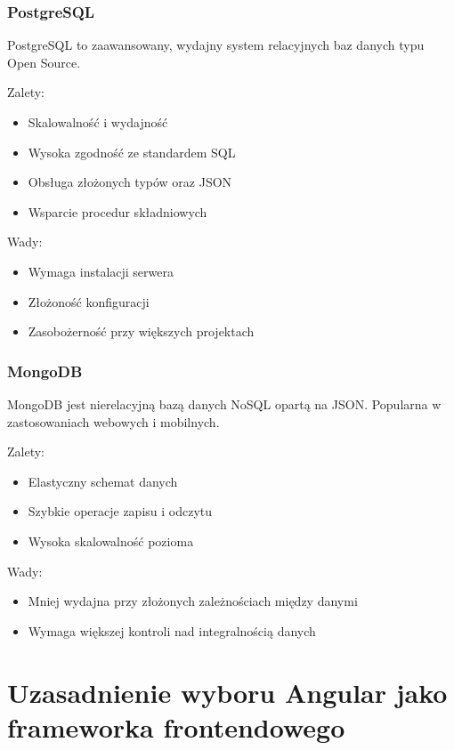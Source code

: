 \subsubsection{PostgreSQL}

PostgreSQL to zaawansowany, wydajny system relacyjnych baz danych typu Open Source.

Zalety:
\begin{itemize}
	\item Skalowalność i wydajność
	\item Wysoka zgodność ze standardem SQL
	\item Obsługa złożonych typów oraz JSON
	\item Wsparcie procedur składniowych
\end{itemize}

Wady:
\begin{itemize}
	\item Wymaga instalacji serwera
	\item Złożoność konfiguracji
	\item Zasobożerność przy większych projektach
\end{itemize}

\subsubsection{MongoDB}

MongoDB jest nierelacyjną bazą danych NoSQL opartą na JSON. Popularna w zastosowaniach webowych i mobilnych.

Zalety:
\begin{itemize}
	\item Elastyczny schemat danych
	\item Szybkie operacje zapisu i odczytu
	\item Wysoka skalowalność pozioma
\end{itemize}

Wady:
\begin{itemize}
	\item Mniej wydajna przy złożonych zależnościach między danymi
	\item Wymaga większej kontroli nad integralnością danych
\end{itemize}

\section{Uzasadnienie wyboru Angular jako frameworka frontendowego}

